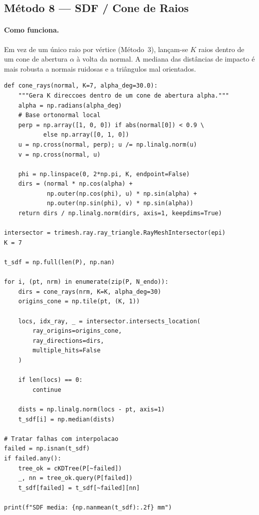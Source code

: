 \subsection{Método 8 --- SDF / Cone de Raios}
\label{impl:sdf}

\paragraph{Como funciona.}
Em vez de um único raio por vértice (Método~3), lançam-se $K$
raios dentro de um cone de abertura $\alpha$ à volta da normal.
A mediana das distâncias de impacto é mais robusta a normais
ruidosas e a triângulos mal orientados.

\begin{lstlisting}
def cone_rays(normal, K=7, alpha_deg=30.0):
    """Gera K direccoes dentro de um cone de abertura alpha."""
    alpha = np.radians(alpha_deg)
    # Base ortonormal local
    perp = np.array([1, 0, 0]) if abs(normal[0]) < 0.9 \
           else np.array([0, 1, 0])
    u = np.cross(normal, perp); u /= np.linalg.norm(u)
    v = np.cross(normal, u)

    phi = np.linspace(0, 2*np.pi, K, endpoint=False)
    dirs = (normal * np.cos(alpha) +
            np.outer(np.cos(phi), u) * np.sin(alpha) +
            np.outer(np.sin(phi), v) * np.sin(alpha))
    return dirs / np.linalg.norm(dirs, axis=1, keepdims=True)

intersector = trimesh.ray.ray_triangle.RayMeshIntersector(epi)
K = 7

t_sdf = np.full(len(P), np.nan)

for i, (pt, nrm) in enumerate(zip(P, N_endo)):
    dirs = cone_rays(nrm, K=K, alpha_deg=30)
    origins_cone = np.tile(pt, (K, 1))

    locs, idx_ray, _ = intersector.intersects_location(
        ray_origins=origins_cone,
        ray_directions=dirs,
        multiple_hits=False
    )

    if len(locs) == 0:
        continue

    dists = np.linalg.norm(locs - pt, axis=1)
    t_sdf[i] = np.median(dists)

# Tratar falhas com interpolacao
failed = np.isnan(t_sdf)
if failed.any():
    tree_ok = cKDTree(P[~failed])
    _, nn = tree_ok.query(P[failed])
    t_sdf[failed] = t_sdf[~failed][nn]

print(f"SDF media: {np.nanmean(t_sdf):.2f} mm")
\end{lstlisting}

